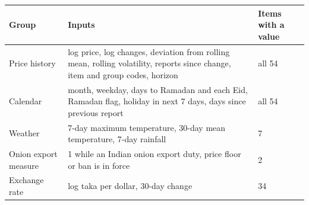 \begin{tabular}{p{3cm}p{7cm}p{2.5cm}}
\toprule
\textbf{Group} & \textbf{Inputs} & \textbf{Items with a value} \\
\midrule
Price history & log price, log changes, deviation from rolling mean, rolling volatility, reports since change, item and group codes, horizon & all 54 \\
Calendar & month, weekday, days to Ramadan and each Eid, Ramadan flag, holiday in next 7 days, days since previous report & all 54 \\
Weather & 7-day maximum temperature, 30-day mean temperature, 7-day rainfall & 7 \\
Onion export measure & 1 while an Indian onion export duty, price floor or ban is in force & 2 \\
Exchange rate & log taka per dollar, 30-day change & 34 \\
\bottomrule
\end{tabular}
